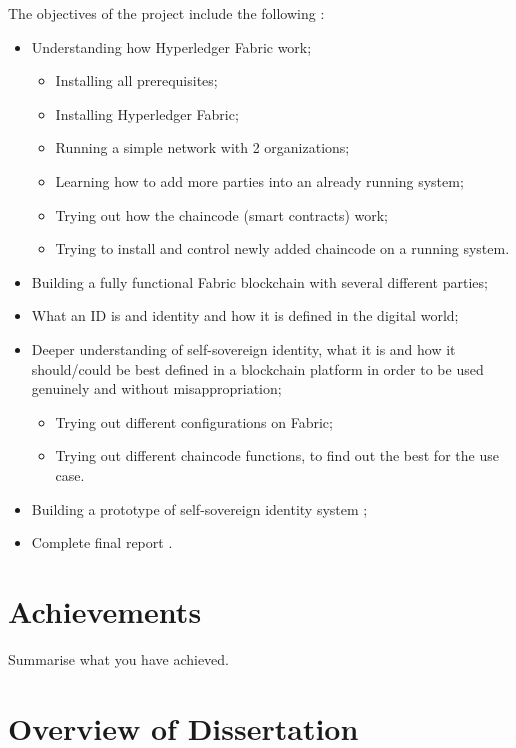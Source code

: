 \documentclass[a4paper,11pt]{report}
\begin{document}
The objectives of the project include the following :  
\begin{itemize}
\item Understanding how Hyperledger Fabric work;
	\begin{itemize}
	\item Installing all prerequisites;
	\item Installing Hyperledger Fabric; 
	\item Running a simple network with 2 organizations; 
	\item Learning how to add more parties into an already running system;
	\item Trying out how the chaincode (smart contracts) work;
	\item Trying to install and control newly added chaincode on a running system.
	\end{itemize}
\item Building a fully functional Fabric blockchain with several different parties;
\item What an ID is  and identity and how it is defined in the digital world;
\item Deeper understanding of self-sovereign identity, what it is and how it should/could be best defined in a blockchain platform in order to be used genuinely and without misappropriation;
	\begin{itemize}
	\item Trying out different configurations on Fabric;
	\item Trying out different chaincode functions, to find out the best for the use case.
	\end{itemize}
\item Building a prototype of self-sovereign identity system ;
\item Complete final report .

\end{itemize}


\section{Achievements}

\label{introduction-achievements}

Summarise what you have achieved.

\section{Overview of Dissertation}
\end{document}
